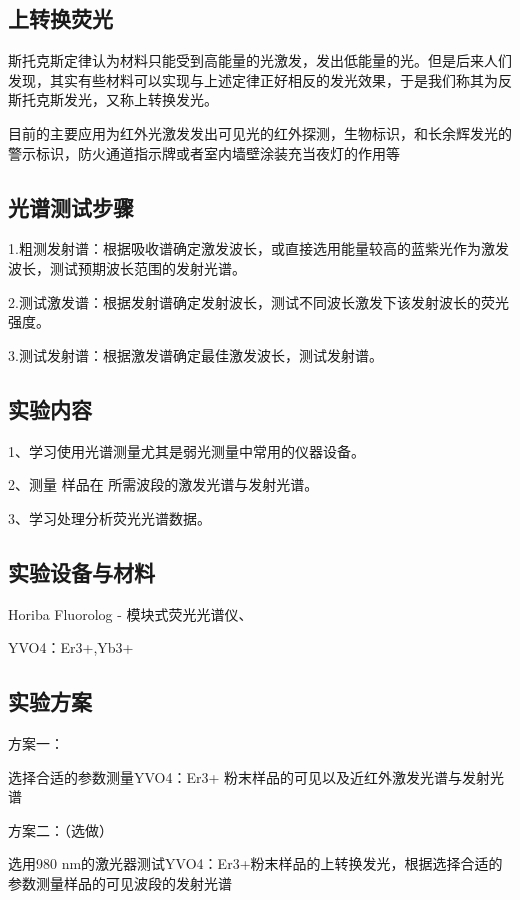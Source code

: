 \documentclass{article}
\begin{document}
\subsection{上转换荧光}
斯托克斯定律认为材料只能受到高能量的光激发，发出低能量的光。但是后来人们发现，其实有些材料可以实现与上述定律正好相反的发光效果，于是我们称其为反斯托克斯发光，又称上转换发光。


目前的主要应用为红外光激发发出可见光的红外探测，生物标识，和长余辉发光的警示标识，防火通道指示牌或者室内墙壁涂装充当夜灯的作用等
\subsection{光谱测试步骤}
1.粗测发射谱：根据吸收谱确定激发波长，或直接选用能量较高的蓝紫光作为激发波长，测试预期波长范围的发射光谱。


2.测试激发谱：根据发射谱确定发射波长，测试不同波长激发下该发射波长的荧光强度。


3.测试发射谱：根据激发谱确定最佳激发波长，测试发射谱。


\subsection{实验内容}

1、学习使用光谱测量尤其是弱光测量中常用的仪器设备。


2、测量 样品在 所需波段的激发光谱与发射光谱。


3、学习处理分析荧光光谱数据。

\subsection{实验设备与材料}

Horiba Fluorolog - 模块式荧光光谱仪、
 
 YVO4：Er3+,Yb3+

\subsection{实验方案}
方案一：

选择合适的参数测量YVO4：Er3+ 粉末样品的可见以及近红外激发光谱与发射光谱


方案二：（选做）

选用980 nm的激光器测试YVO4：Er3+粉末样品的上转换发光，根据选择合适的参数测量样品的可见波段的发射光谱
\end{document}
